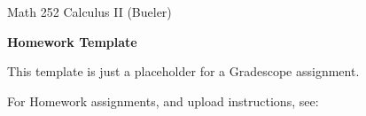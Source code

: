 \documentclass[12pt]{amsart}
\begin{document}
\scriptsize \noindent Math 252 Calculus II (Bueler)
\normalsize\medskip

\Large\centerline{\textbf{Homework Template}}
\large
\bigskip \bigskip

\normalsize
This template is just a placeholder for a Gradescope assignment.

\bigskip
For Homework assignments, and upload instructions, see:

\begin{center}
\Large
{}
\end{center}
\end{document}
